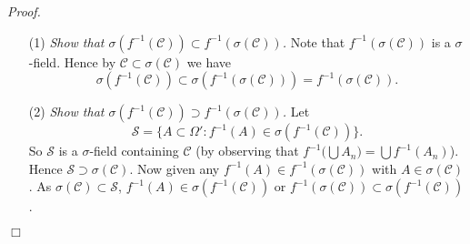 \documentclass{article}
\begin{document}
\emph{Proof.}
\begin{enumerate}
\item[(1)]
  \emph{Show that $\sigma(f^{-1}(\mathscr{C})) \subset f^{-1}(\sigma(\mathscr{C}))$.}
  Note that $f^{-1}(\sigma(\mathscr{C}))$ is a $\sigma$-field.
  Hence by $\mathscr{C} \subset \sigma(\mathscr{C})$ we have
  \[
   \sigma(f^{-1}(\mathscr{C}))
   \subset \sigma(f^{-1}(\sigma(\mathscr{C})))
   = f^{-1}(\sigma(\mathscr{C})). 
  \]

\item[(2)]
  \emph{Show that $\sigma(f^{-1}(\mathscr{C})) \supset f^{-1}(\sigma(\mathscr{C}))$.}
  Let
  \[
    \mathscr{S} = \{ A \subset \Omega' : f^{-1}(A) \in \sigma(f^{-1}(\mathscr{C})) \}.
  \]
  So $\mathscr{S}$ is a $\sigma$-field containing $\mathscr{C}$
  (by observing that $f^{-1}\big( \bigcup A_n \big) = \bigcup f^{-1}(A_n)$).
  Hence $\mathscr{S} \supset \sigma(\mathscr{C})$.
  Now given any $f^{-1}(A) \in f^{-1}(\sigma(\mathscr{C}))$
  with $A \in \sigma(\mathscr{C})$.
  As $\sigma(\mathscr{C}) \subset \mathscr{S}$,
  $f^{-1}(A) \in \sigma(f^{-1}(\mathscr{C}))$ or
  $f^{-1}(\sigma(\mathscr{C})) \subset \sigma(f^{-1}(\mathscr{C}))$.
\end{enumerate}
$\Box$ \\\\






\end{document}
